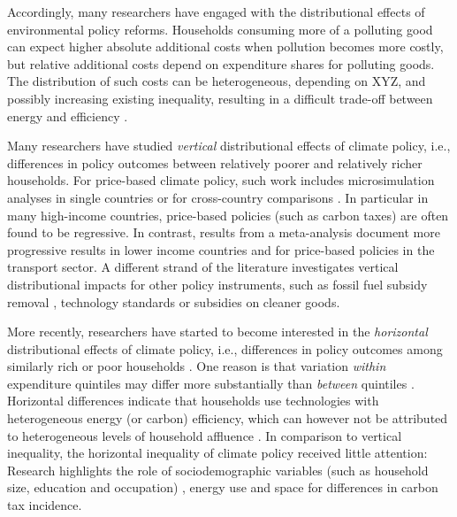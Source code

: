 \documentclass[12pt, a4paper]{article}
\begin{document}
Accordingly, many researchers have engaged with the distributional effects of environmental policy reforms. Households consuming more of a polluting good can expect higher absolute additional costs when pollution becomes more costly, but relative additional costs depend on expenditure shares for polluting goods. The distribution of such costs can be heterogeneous, depending on XYZ, and possibly increasing existing inequality, resulting in a difficult trade-off between energy and efficiency \autocite{Hansel.2022}.

Many researchers have studied \textit{vertical} distributional effects of climate policy, i.e., differences in policy outcomes between relatively poorer and relatively richer households. For price-based climate policy, such work includes microsimulation analyses in single countries \autocite{Goulder.2019,Grainger.2010,Rausch.2011,Garaffa.2021,Sterner.2012,Wu.2022} or for cross-country comparisons \autocite{Budolfson.2021,Feindt.2021,Dorband.2019,Steckel.2021b,VogtSchilb.2019,Missbach.2023b}. In particular in many high-income countries, price-based policies (such as carbon taxes) are often found to be regressive. In contrast, results from a meta-analysis \autocite{Ohlendorf.2021} document more progressive results in lower income countries and for price-based policies in the transport sector.
A different strand of the literature investigates vertical distributional impacts for other policy instruments, such as fossil fuel subsidy removal \autocite{Schaffitzel.2019,Giuliano.2020}, technology standards \autocite{Levinson.2019,Zhao.2022} or subsidies on cleaner goods. %

More recently, researchers have started to become interested in the \textit{horizontal} distributional effects of climate policy, i.e., differences in policy outcomes among similarly rich or poor households \autocite{Rausch.2011,Fischer.2019}. One reason is that variation \textit{within} expenditure quintiles may differ more substantially than \textit{between} quintiles \autocite{Cronin.2019,Steckel.2021b,Pizer.2019}. Horizontal differences indicate that households use technologies with heterogeneous energy (or carbon) efficiency, which can however not be attributed to heterogeneous levels of household affluence \autocite{Hansel.2022}. In comparison to vertical inequality, the horizontal inequality of climate policy received little attention: Research highlights the role of sociodemographic variables (such as household size, education and occupation) \autocite{Grainger.2010,Buchs.2013,Farrell.2017,Missbach.2023}, energy use \autocite{Steckel.2021b,Missbach.2023b} and space \autocite{Chan.2023} for differences in carbon tax incidence.
\end{document}

